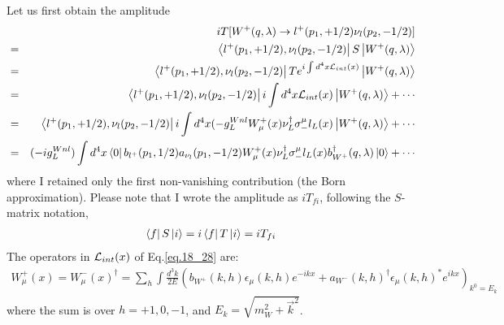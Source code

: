 \documentclass[12pt]{article}
\def\dgr{\dagger}
\begin{document}
Let us first obtain the amplitude
\begin{eqnarray}
    &&iT[W^+(q,\lambda) \to l^+(p_1,+1/2) \nu_l(p_2,-1/2)] \nonumber \\ 
    &=&\bra{l^+(p_1,+1/2),\nu_l(p_2,-1/2)} S\ket{W^+(q,\lambda)} \\
    &=& \bra{l^+(p_1,+1/2),\nu_l(p_2,-1/2)} Te^{i\int d^4x {\cal L}_{int}(x)} \ket{W^+(q,\lambda)} \\
    &=& \bra{l^+(p_1,+1/2),\nu_l(p_2,-1/2)} i\int d^4x {\cal L}_{int}(x) \ket{W^+(q,\lambda)}+\cdots \\
    &=&\bra{l^+(p_1,+1/2),\nu_l(p_2,-1/2)} i\int d^4x
    (-g_L^{Wnl} W^+_\mu(x) \nu_L^\dagger \sigma_-^\mu l_L(x) \ket{W^+(q,\lambda)} + \cdots\\
    &=&(-ig_L^{Wnl}) \int d^4x \bra{0}b_{l^+}(p_1,1/2) a_{\nu_l}(p_1,-1/2)
    W^+_\mu(x) \nu_L^\dagger \sigma_-^\mu l_L(x) b^\dagger_{W^+}(q,\lambda) \ket{0}+\cdots \label{eq.18_28}
\end{eqnarray}
where I retained only the first non-vanishing contribution (the Born
approximation).  Please note that I wrote the amplitude as $iT_{fi}$,
following the $S$-matrix notation,
\begin{eqnarray}
    \bra{f}S\ket{i}=i\bra{f}T\ket{i}=i T_{fi}\label{eq.18_29}
\end{eqnarray}
The operators in ${\cal L}_{int}(x)$ of Eq.\ref{eq.18_28} are:
\begin{eqnarray}
    W^+_\mu(x) = W^-_\mu(x)^\dgr
= \sum_h \int \frac{d^3k}{2E}
( b_{W^+}(k,h)         \epsilon_\mu(k,h)   e^{-ikx}
+ a_{W^-}(k,h)^\dagger \epsilon_\mu(k,h)^* e^{ikx})_{k^0=E_k} \label{eq.18_30}
\end{eqnarray}
where the sum is over $h=+1,0,-1$, and $E_k=\sqrt{m_W^2+{\vec k}^2}$.
\end{document}
